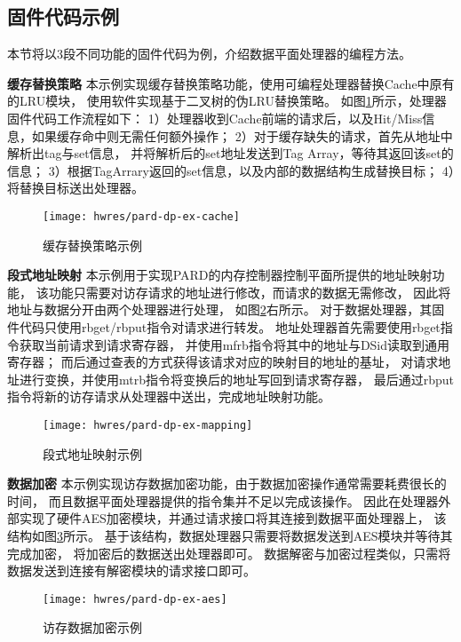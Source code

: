 \subsection{固件代码示例}
本节将以3段不同功能的固件代码为例，介绍数据平面处理器的编程方法。

\textbf{缓存替换策略}\quad
本示例实现缓存替换策略功能，使用可编程处理器替换Cache中原有的LRU模块，
使用软件实现基于二叉树的伪LRU替换策略。
如图\ref{fig:pard-dp-ex-cache}所示，处理器固件代码工作流程如下：
1）处理器收到Cache前端的请求后，以及Hit/Miss信息，如果缓存命中则无需任何额外操作；
2）对于缓存缺失的请求，首先从地址中解析出tag与set信息，
并将解析后的set地址发送到Tag Array，等待其返回该set的信息；
3）根据TagArrary返回的set信息，以及内部的数据结构生成替换目标；
4）将替换目标送出处理器。

\begin{figure}[H]
  \centering
  \texttt{[image: hwres/pard-dp-ex-cache]}
  \caption{缓存替换策略示例}
  \label{fig:pard-dp-ex-cache}
\end{figure}


\textbf{段式地址映射}\quad
本示例用于实现PARD的内存控制器控制平面所提供的地址映射功能，
该功能只需要对访存请求的地址进行修改，而请求的数据无需修改，
因此将地址与数据分开由两个处理器进行处理，
如图\ref{fig:pard-dp-ex-mapping}右所示。
对于数据处理器，其固件代码只使用rbget/rbput指令对请求进行转发。
地址处理器首先需要使用rbget指令获取当前请求到请求寄存器，
并使用mfrb指令将其中的地址与DSid读取到通用寄存器；
而后通过查表的方式获得该请求对应的映射目的地址的基址，
对请求地址进行变换，并使用mtrb指令将变换后的地址写回到请求寄存器，
最后通过rbput指令将新的访存请求从处理器中送出，完成地址映射功能。

\begin{figure}[H]
  \centering
  \texttt{[image: hwres/pard-dp-ex-mapping]}
  \caption{段式地址映射示例}
  \label{fig:pard-dp-ex-mapping}
\end{figure}
 
\textbf{数据加密}\quad
本示例实现访存数据加密功能，由于数据加密操作通常需要耗费很长的时间，
而且数据平面处理器提供的指令集并不足以完成该操作。
因此在处理器外部实现了硬件AES加密模块，并通过请求接口将其连接到数据平面处理器上，
该结构如图\ref{fig:pard-dp-ex-aes}所示。
基于该结构，数据处理器只需要将数据发送到AES模块并等待其完成加密，
将加密后的数据送出处理器即可。
数据解密与加密过程类似，只需将数据发送到连接有解密模块的请求接口即可。

\begin{figure}[H]
  \centering
  \texttt{[image: hwres/pard-dp-ex-aes]}
  \caption{访存数据加密示例}
  \label{fig:pard-dp-ex-aes}
\end{figure}
 

